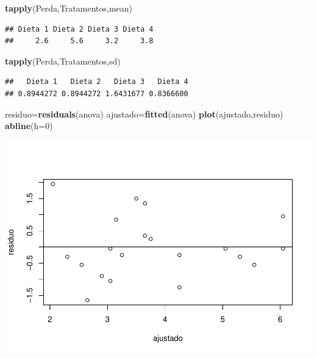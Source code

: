 \documentclass[12pt,brazil,]{book}
\newenvironment{Shaded}{\begin{snugshade}}{\end{snugshade}}
\newcommand{\DataTypeTok}[1]{\textcolor[rgb]{0.13,0.29,0.53}{#1}}
\newcommand{\DecValTok}[1]{\textcolor[rgb]{0.00,0.00,0.81}{#1}}
\newcommand{\KeywordTok}[1]{\textcolor[rgb]{0.13,0.29,0.53}{\textbf{#1}}}
\newcommand{\NormalTok}[1]{#1}
\begin{document}
\begin{Shaded}
\begin{Highlighting}[]
\KeywordTok{tapply}\NormalTok{(Perda,Tratamentos,mean)}
\end{Highlighting}
\end{Shaded}

\begin{verbatim}
## Dieta 1 Dieta 2 Dieta 3 Dieta 4 
##     2.6     5.6     3.2     3.8
\end{verbatim}

\begin{Shaded}
\begin{Highlighting}[]
\KeywordTok{tapply}\NormalTok{(Perda,Tratamentos,sd)}
\end{Highlighting}
\end{Shaded}

\begin{verbatim}
##   Dieta 1   Dieta 2   Dieta 3   Dieta 4 
## 0.8944272 0.8944272 1.6431677 0.8366600
\end{verbatim}

\begin{Shaded}
\begin{Highlighting}[]
\NormalTok{residuo=}\KeywordTok{residuals}\NormalTok{(anova)}
\NormalTok{ajustado=}\KeywordTok{fitted}\NormalTok{(anova)}
\KeywordTok{plot}\NormalTok{(ajustado,residuo)}
\KeywordTok{abline}\NormalTok{(}\DataTypeTok{h=}\DecValTok{0}\NormalTok{)}
\end{Highlighting}
\end{Shaded}

\includegraphics{02-Delinexp_files/figure-latex/unnamed-chunk-14-1.pdf}
\end{document}
